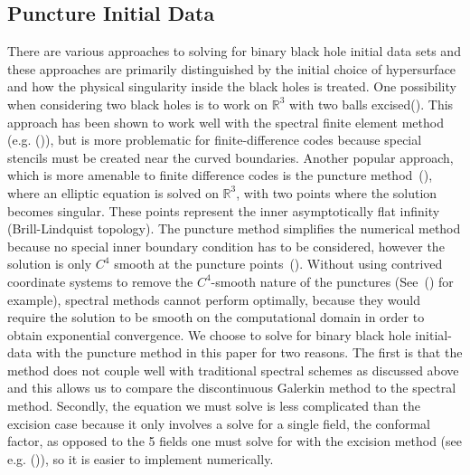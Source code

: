 

\subsection{Puncture Initial Data}
\label{sec:punctureinitialdata}

There are various approaches to solving for binary black hole initial
data sets and these approaches are primarily distinguished by the
initial choice of hypersurface and how the physical singularity inside
the black holes is treated. One possibility when considering two black
holes is to work on $\mathbb{R}^{3}$ with two balls excised(\cite{cook1994,cook2004excision,caudill2006circular}). This approach has
been shown to work well with the spectral finite element method
(e.g. (\cite{pfeiffer2003multidomain})), but is more problematic for
finite-difference codes because special stencils must be created near
the curved boundaries. Another popular approach, which is more
amenable to finite difference codes is the puncture method~(\cite{brandt1997simple}),
where an elliptic equation is solved on $\mathbb{R}^3$, with
two points where the solution becomes singular.  These points represent
the inner asymptotically flat infinity (Brill-Lindquist
topology).   The puncture
method simplifies the numerical method because no special inner
boundary condition has to be considered, however the solution is only
$C^4$ smooth at the puncture points~(\cite{brandt1997simple}). Without using contrived
coordinate systems to remove the $C^4$-smooth nature of the
punctures (See~(\cite{ansorg2004single}) for example), spectral methods
cannot perform optimally, because they would require the solution to
be smooth on the computational domain in order to obtain exponential
convergence. We choose to solve for binary black hole initial-data
with the puncture method in this paper for two reasons. The first is
that the method does not couple well with traditional spectral schemes
as discussed above and this allows us to compare the discontinuous
Galerkin method to the spectral method. Secondly, the equation we must
solve is less complicated than the excision case because it only
involves a solve for a single field, the conformal factor, as opposed
to the 5 fields one must solve for with the excision method (see
e.g. (\cite{pfeiffer2003multidomain})), so it is easier to implement
numerically.

